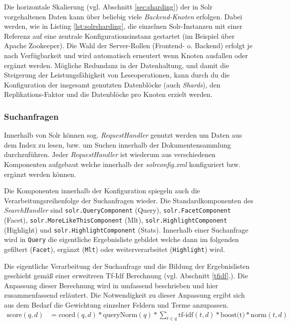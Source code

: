 

Die horizontale Skalierung (vgl. Abschnitt \ref{sec:sharding}) der in Solr vorgehaltenen Daten kann über beliebig viele \textit{Backend-Knoten} erfolgen. Dabei werden, wie in Listing \ref{lst:solrsharding}, die einzelnen Solr-Instanzen mit einer Referenz auf eine zentrale Konfigurationsinstanz gestartet (im Beispiel über Apache Zookeeper). Die Wahl der Server-Rollen (Frontend- o. Backend) erfolgt je nach Verfügbarkeit und wird automatisch erneutert wenn Knoten ausfallen oder ergänzt werden. Mögliche Redundanz in der Datenhaltung, und damit die Steigerung der Leistungsfähigkeit von Leseoperationen, kann durch du die Konfiguration der insgesamt genutzten Datenblöcke (auch \textit{Shards}), den Replikations-Faktor und die Datenblöcke pro Knoten erzielt werden.

\subsubsection{Suchanfragen}

Innerhalb von Solr können sog. \textit{RequestHandler} genutzt werden um Daten aus dem Index zu lesen, bzw. um Suchen innerhalb der Dokumentensammlung durchzuführen. Jeder \textit{RequestHandler} ist wiederum aus verschiedenen Komponenten aufgebaut welche innerhalb der \textit{solrconfig.xml} konfiguriert bzw. ergänzt werden können. 

Die Komponenten innerhalb der Konfiguration spiegeln auch die Verarbeitungsreihenfolge der Suchanfragen wieder. Die Standardkomponenten des \textit{SearchHandler} sind \texttt{solr.QueryComponent} (Query), \texttt{solr.FacetComponent} (Facet), \texttt{solr.MoreLikeThisComponent} (Mlt), \texttt{solr.HighlightComponent} (Highlight) und \texttt{solr.HighlightComponent} (Stats). Innerhalb einer Suchanfrage wird in \texttt{Query} die eigentliche Ergebnisliste gebildet welche dann im folgenden gefiltert (\texttt{Facet}), ergänzt (\texttt{Mlt}) oder weiterverarbeitet (\texttt{Highlight}) wird.

Die eigentliche Verarbeitung der Suchanfrage und die Bildung der Ergebnislisten geschieht gemäß einer erweitreen Tf-Idf Berechnung (vgl. Abschnitt \ref{tfidf}.). Die Anpassung dieser Berechnung wird in \citep{TFIDFSimilarity} umfassend beschrieben und hier zusammenfassend erläutert. Die Notwendigkeit zu dieser Anpassung ergibt sich aus dem Bedarf die Gewichtung einzelner Feldern und Terme anzupassen.
\begin{align}
\text{score}(q, d) & = \text{coord}(q,d) \ast \text{queryNorm}(q) \ast \sum_{t \in q}{\text{tf-idf}(t, d) \ast \text{boost(t)} \ast \text{norm}(t,d)} \label{lucenedocscore}
\end{align}

